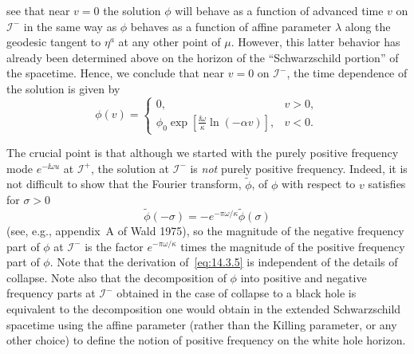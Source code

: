 see that near \(v=0\) the solution \(\phi\) will behave as a function of advanced
time \(v\) on \(\mathcal I^-\) in the same way as \(\phi\) behaves as a function of
affine parameter \(\lambda\) along the geodesic tangent to \(\eta^a\) at any other
point of \(\mu\). However, this latter behavior has already been determined above on
the horizon of the ``Schwarzschild portion'' of the spacetime. Hence, we conclude
that near \(v=0\) on \(\mathcal I^-\), the time dependence of the solution is given
by
\begin{equation}
  \phi(v)=
  \begin{cases}
    0, & v>0,\\[2pt]
    \displaystyle \phi_0\exp\!\left[\frac{\ii\omega}{\kappa}
      \ln(-\alpha v)\right], & v<0.
  \end{cases}
  \tag{14.3.5}\label{eq:14.3.5}
\end{equation}




The crucial point is that although we started with the purely positive frequency mode
\(e^{-\ii\omega u}\) at \(\mathcal I^+\), the solution at \(\mathcal I^-\) is
\emph{not} purely positive frequency. Indeed, it is not difficult to show that the
Fourier transform, \(\widetilde\phi\), of \(\phi\) with respect to \(v\) satisfies for
\(\sigma>0\)
\begin{equation}
  \widetilde\phi(-\sigma)
  =-e^{-\pi\omega/\kappa}\widetilde\phi(\sigma)
  \tag{14.3.6}\label{eq:14.3.6}
\end{equation}
(see, e.g., appendix~A of Wald 1975), so the magnitude of the negative frequency
part of \(\phi\) at \(\mathcal I^-\) is the factor \(e^{-\pi\omega/\kappa}\) times the
magnitude of the positive frequency part of \(\phi\). Note that the derivation
of~\eqref{eq:14.3.5} is independent of the details of collapse. Note also that the
decomposition of \(\phi\) into positive and negative frequency parts at
\(\mathcal I^-\) obtained in the case of collapse to a black hole is equivalent to the
decomposition one would obtain in the extended Schwarzschild spacetime using the
affine parameter (rather than the Killing parameter, or any other choice) to define
the notion of positive frequency on the white hole horizon.

